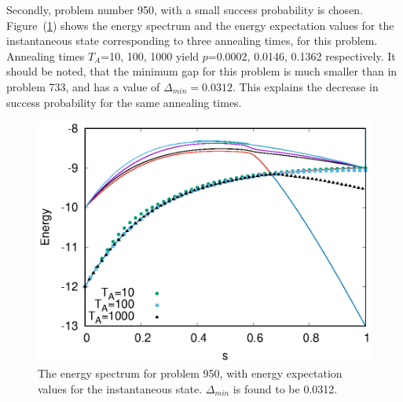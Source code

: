 \documentclass[../main.tex]{subfiles}
\begin{document}
Secondly, problem number 950, with a small success probability is chosen. Figure~(\ref{fig:o3}) shows the energy spectrum and the energy expectation values for the instantaneous state corresponding to three annealing times, for this problem. Annealing  times $T_A$=10, 100, 1000 yield $p$=0.0002, 0.0146, 0.1362 respectively. It should be noted, that the minimum gap for this problem is much smaller than in problem 733, and has a value of $\Delta_{min} = 0.0312$. This explains the decrease in success probability for the same annealing times.\\
\begin{figure}[H]
\centering 
\includegraphics[scale=0.8]{950_s12_O.eps}
\caption{The energy spectrum for problem 950, with energy expectation values for the instantaneous state. $\Delta_{min}$ is found to be 0.0312.}
\label{fig:o3}
\end{figure}
\end{document}
